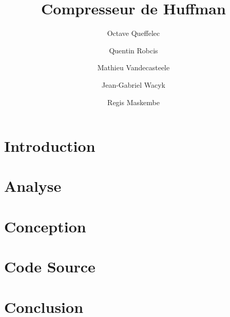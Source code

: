 \documentclass{article}
\title{Compresseur de Huffman}
\author{Octave Queffelec \and Quentin Robcis \and Mathieu Vandecasteele \and Jean-Gabriel Wacyk \and Regis Maskembe}
\begin{document}
\maketitle
\newpage


\tableofcontents
\newpage


\section{Introduction}


\newpage
\section{Analyse}


\newpage
\section{Conception}



\newpage
\section{Code Source}



\newpage
\section{Conclusion}

\end{document}
